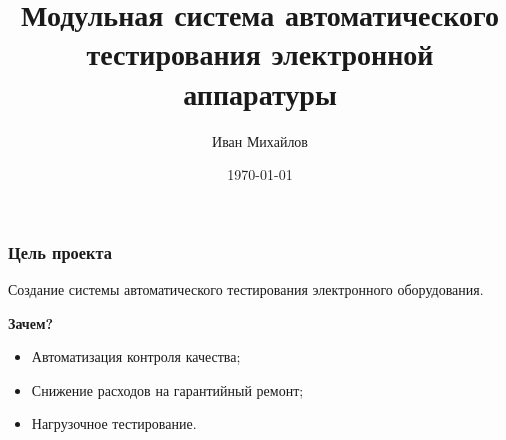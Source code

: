 \documentclass{beamer}
\title[Магистерский проект]{Модульная система автоматического тестирования электронной аппаратуры} %
\author{Иван Михайлов} %
\institute[СПбНИУ ИТМО] %
{
Санкт-Петербургский Национальный Исследовательский Университет Информационных Технологий, Механики и Оптики
}
\date{\today} %
\begin{document}
\begin{frame}
\titlepage %
\end{frame}





\begin{frame}
\frametitle{Цель проекта}
Создание системы автоматического тестирования электронного оборудования.

\textbf{Зачем?}
\begin{itemize}
\item Автоматизация контроля качества;
\item Снижение расходов на гарантийный ремонт;
\item Нагрузочное тестирование.
\end{itemize}
\end{frame}
\end{document}
